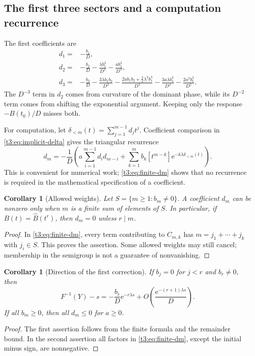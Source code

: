 \documentclass[11pt,openany]{book}
\numberwithin{equation}{chapter}
\theoremstyle{plain}
\newtheorem{corollary}[theorem]{Corollary}
\theoremstyle{definition}
\theoremstyle{remark}
\newcommand{\ee}{\mathrm e}
\newcommand{\coefB}[2]{[#1^{#2}]}             %
\begin{document}
\subsection{The first three sectors and a computation recurrence}

The first coefficients are
\begin{align}
 d_1={}&-\frac{b_1}{D},\label{t3:eq:d1}\\
 d_2={}&-\frac{b_2}{D}-\frac{\lambda b_1^2}{D^2}
                   -\frac{a b_1^2}{D^3},\label{t3:eq:d2}\\
 d_3={}&-\frac{b_3}{D}-\frac{3\lambda b_1b_2}{D^2}
 -\frac{2a b_1b_2+\tfrac32\lambda^2b_1^3}{D^3}
 -\frac{3a\lambda b_1^3}{D^4}
 -\frac{2a^2b_1^3}{D^5}.\label{t3:eq:d3}
\end{align}
The $D^{-3}$ term in $d_2$ comes from curvature of the dominant phase, while its $D^{-2}$ term comes from shifting the exponential argument. Keeping only the response $-B(t_0)/D$ misses both.

For computation, let $\delta_{<m}(t)=\sum_{j=1}^{m-1}d_jt^j$. Coefficient comparison in \eqref{t3:eq:implicit-delta} gives the triangular recurrence
\begin{equation}\label{t3:eq:dm-recurrence}
 d_m=-\frac1D\left(
 a\sum_{i=1}^{m-1}d_i d_{m-i}
 +\sum_{k=1}^m b_k\coefB{t}{m-k}
     \ee^{-k\lambda\delta_{<m}(t)}\right).
\end{equation}
This is convenient for numerical work; \eqref{t3:eq:finite-dm} shows that no recurrence is required in the mathematical specification of a coefficient.

\begin{corollary}[Allowed weights]\label{t3:cor:support}
Let $S=\{m\ge1:b_m\ne0\}$. A coefficient $d_m$ can be nonzero only when $m$ is a finite sum of elements of $S$. In particular, if $B(t)=\widehat B(t^r)$, then $d_m=0$ unless $r\mid m$.
\end{corollary}
\begin{proof}
In \eqref{t3:eq:finite-dm}, every term contributing to $C_{m,k}$ has $m=j_1+\cdots+j_k$ with $j_i\in S$. This proves the assertion. Some allowed weights may still cancel; membership in the semigroup is not a guarantee of nonvanishing.
\end{proof}

\begin{corollary}[Direction of the first correction]\label{t3:cor:sign}
If $b_j=0$ for $j<r$ and $b_r\ne0$, then
\[
 F^{-1}(Y)-s=-\frac{b_r}{D}\ee^{-r\lambda s}
 +O\!\left(\frac{\ee^{-(r+1)\lambda s}}{D}\right).
\]
If all $b_m\ge0$, then all $d_m\le0$ for $a\ge0$.
\end{corollary}
\begin{proof}
The first assertion follows from the finite formula and the remainder bound. In the second assertion all factors in \eqref{t3:eq:finite-dm}, except the initial minus sign, are nonnegative.
\end{proof}
\end{document}

